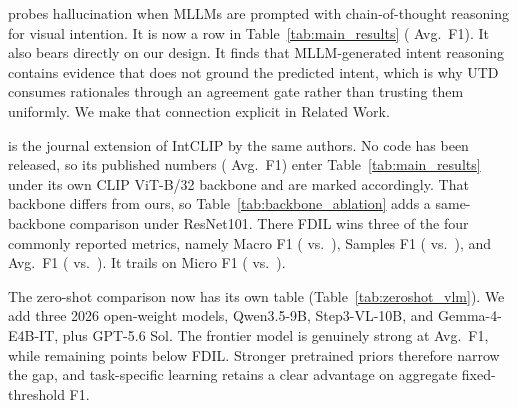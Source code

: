 {

 probes hallucination when MLLMs are prompted with chain-of-thought reasoning for visual intention. It is now a row in Table~\ref{tab:main_results} ( Avg.\ F1). It also bears directly on our design. It finds that MLLM-generated intent reasoning contains evidence that does not ground the predicted intent, which is why UTD consumes rationales through an agreement gate rather than trusting them uniformly. We make that connection explicit in Related Work.

 is the journal extension of IntCLIP by the same authors. No code has been released, so its published numbers ( Avg.\ F1) enter Table~\ref{tab:main_results} under its own CLIP ViT-B/32 backbone and are marked accordingly. That backbone differs from ours, so Table~\ref{tab:backbone_ablation} adds a same-backbone comparison under ResNet101. There FDIL wins three of the four commonly reported metrics, namely Macro F1 ( vs.\ ), Samples F1 ( vs.\ ), and Avg.\ F1 ( vs.\ ). It trails on Micro F1 ( vs.\ ).

 The zero-shot comparison now has its own table (Table~\ref{tab:zeroshot_vlm}). We add three 2026 open-weight models, Qwen3.5-9B, Step3-VL-10B, and Gemma-4-E4B-IT, plus GPT-5.6 Sol. The frontier model is genuinely strong at  Avg.\ F1, while remaining  points below FDIL. Stronger pretrained priors therefore narrow the gap, and task-specific learning retains a clear advantage on aggregate fixed-threshold F1.
}
\showMainResults
\showZeroShot

